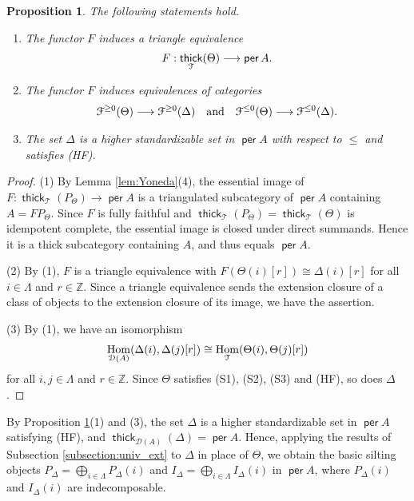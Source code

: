 \documentclass[a4paper,reqno,11pt]{amsart}
\numberwithin{equation}{section}
\newtheorem{proposition}[theorem]{Proposition}
\theoremstyle{definition}
\newcommand{\D}{\mathcal{D}}
\newcommand{\F}{\mathcal{F}}
\newcommand{\T}{\mathcal{T}}
\newcommand{\ZZ}{\mathbb{Z}}
\newcommand{\bte}{\Theta}
\newcommand{\bde}{\Delta}
\newcommand{\lto}{\longrightarrow}
\DeclareMathOperator{\thick}{\mathsf{thick}}
\DeclareMathOperator{\per}{\mathsf{per}}
\DeclareMathOperator{\Hom}{Hom}
\begin{document}
\begin{proposition}\label{prop:fullyfaithful}
The following statements hold.
\begin{enumerate}
\item The functor $F$ induces a triangle equivalence
\begin{align}
F:\thick_{\T}(\bte)\longrightarrow\per A.\notag
\end{align}
\item The functor $F$ induces equivalences of categories
\begin{align}
\F^{\geq 0}(\bte)\lto\F^{\geq 0}(\bde) \quad\text{and}\quad \F^{\leq 0}(\bte)\lto\F^{\leq 0}(\bde).\notag
\end{align}
\item The set $\bde$ is a higher standardizable set in $\per A$ with respect to $\leq$ and satisfies (HF).
\end{enumerate}
\end{proposition}
\begin{proof}
(1) By Lemma \ref{lem:Yoneda}(4), the essential image of $F:\thick_{\T}(P_{\bte})\to\per A$ is a triangulated subcategory of $\per A$ containing $A=FP_{\bte}$.
Since $F$ is fully faithful and $\thick_{\T}(P_{\bte})=\thick_{\T}(\bte)$ is idempotent complete, the essential image is closed under direct summands.
Hence it is a thick subcategory containing $A$, and thus equals $\per A$.

(2) By (1), $F$ is a triangle equivalence with $F(\bte(i)[r])\cong\bde(i)[r]$ for all $i\in\Lambda$ and $r\in\ZZ$.
Since a triangle equivalence sends the extension closure of a class of objects to the extension closure of its image, we have the assertion.

(3) By (1), we have an isomorphism
\begin{align}
\Hom_{\D(A)}(\bde(i),\bde(j)[r]) \cong\Hom_{\T}(\bte(i),\bte(j)[r])\notag
\end{align}
for all $i,j\in\Lambda$ and $r\in\ZZ$.
Since $\bte$ satisfies (S1), (S2), (S3) and (HF), so does $\bde$.
\end{proof}

By Proposition \ref{prop:fullyfaithful}(1) and (3), the set $\bde$ is a higher standardizable set in $\per A$ satisfying (HF), and $\thick_{\D(A)}(\bde)=\per A$.
Hence, applying the results of Subsection \ref{subsection:univ_ext} to $\bde$ in place of $\bte$, we obtain the basic silting objects $P_{\bde}=\bigoplus_{i\in\Lambda}P_{\bde}(i)$ and $I_{\bde}=\bigoplus_{i\in\Lambda}I_{\bde}(i)$ in $\per A$, where $P_{\bde}(i)$ and $I_{\bde}(i)$ are indecomposable.
\end{document}
